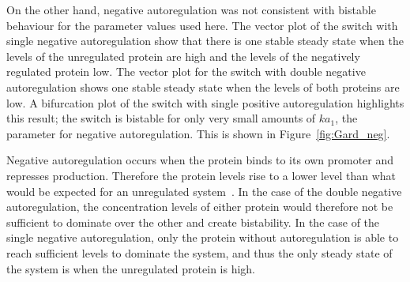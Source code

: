 On the other hand, negative autoregulation was not consistent with bistable behaviour for the parameter values used here. The vector plot of the switch with single negative autoregulation show that there is one stable steady state when the levels of the unregulated protein are high and the levels of the negatively regulated protein low. The vector plot for the switch with double negative autoregulation shows one stable steady state when the levels of both proteins are low. A bifurcation plot of the switch with single positive autoregulation highlights this result; the switch is bistable for only very small amounts of $ka_1$, the parameter for negative autoregulation. This is shown in Figure~\ref{fig:Gard_neg}.

Negative autoregulation occurs when the protein binds to its own promoter and represses production. Therefore the protein levels rise to a lower level than what would be expected for an unregulated system~\autocite{Alon:2007}. In the case of the double negative autoregulation, the concentration levels of either protein would therefore not be sufficient to dominate over the other and create bistability. In the case of the single negative autoregulation, only the protein without autoregulation is able to reach sufficient levels to dominate the system, and thus the only steady state of the system is when the unregulated protein is high.


